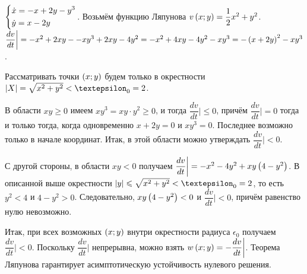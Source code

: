 \documentclass[a5paper,10pt]{article}
\begin{document}
$\left\{ \begin{aligned}& \dot{x} = -x + 2y - y^3 \\& \dot{y} = x - 2y\end{aligned} \right.$. Возьмём функцию Ляпунова $v\left(x; y\right) = \dfrac {1} {2} x^2 + y^2$.
$\dfrac {dv} {dt} \bigg| = -x^2 + 2xy - \linebreak - xy^3 + 2xy - 4y^2 = -x^2 + 4xy - 4y^2 - xy^3 = -\br{x + 2y}^2 - xy^3$.

Рассматривать точки $\left(x; y\right)$ будем только в окрестности $\vbr{X} = \sqrt{x^2 + y^2} < \epsilon_{0} = 2$.

В области $xy \ge 0$ имеем $xy^3 = xy \cdot y^2 \ge 0$, и тогда $\dfrac {dv} {dt} \bigg| \le 0$, причём $\dfrac {dv} {dt} \bigg| = 0$ тогда и только тогда, когда одновременно $x + 2y = 0$ и $xy^3 = 0$. Последнее возможно только в начале координат. Итак, в этой области можно утверждать $\dfrac {dv} {dt} \bigg| < 0$.

С другой стороны, в области $xy < 0$ получаем $\dfrac {dv} {dt} \bigg| = -x^2 - 4y^2 + xy \left(4 - y^2\right)$. В описанной выше окрестности $\vbr{y} \le \sqrt{x^2 + y^2} < \epsilon_{0} = 2$, то есть $y^2 < 4$ и $4 - y^2 > 0$.
Следовательно, $xy \left(4 - y^2\right) < 0$ и $\dfrac {dv} {dt} \bigg| < 0$, причём равенство нулю невозможно.

Итак, при всех возможных $\left(x; y\right)$ внутри окрестности радиуса $\epsilon_{0}$ получаем $\dfrac {dv} {dt} \bigg| < 0$. Поскольку $\dfrac {dv} {dt} \bigg|$ непрерывна, можно взять $w\left(x; y\right) = -\dfrac {dv} {dt} \bigg|$. Теорема Ляпунова гарантирует асимптотическую устойчивость нулевого решения.
\end{document}
